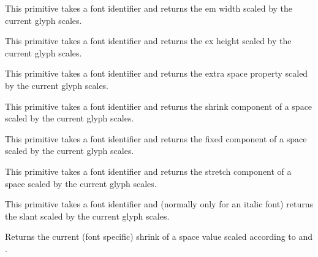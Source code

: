 \startnewprimitive[title={\prm {scaledfontemwidth}}]

This primitive takes a font identifier and returns the em width
scaled by the current glyph scales.

\stopnewprimitive

\startnewprimitive[title={\prm {scaledfontexheight}}]

This primitive takes a font identifier and returns the ex height
scaled by the current glyph scales.

\stopnewprimitive

\startnewprimitive[title={\prm {scaledfontextraspace}}]

This primitive takes a font identifier and returns the extra space
property scaled by the current glyph scales.

\stopnewprimitive

\startnewprimitive[title={\prm {scaledfontinterwordshrink}}]

This primitive takes a font identifier and returns the shrink
component of a space scaled by the current glyph scales.

\stopnewprimitive

\startnewprimitive[title={\prm {scaledfontinterwordspace}}]

This primitive takes a font identifier and returns the fixed
component of a space scaled by the current glyph scales.

\stopnewprimitive

\startnewprimitive[title={\prm {scaledfontinterwordstretch}}]

This primitive takes a font identifier and returns the stretch
component of a space scaled by the current glyph scales.

\stopnewprimitive

\startnewprimitive[title={\prm {scaledfontslantperpoint}}]

This primitive takes a font identifier and (normally only for an italic font)
returns the slant scaled by the current glyph scales.

\stopnewprimitive

\startnewprimitive[title={\prm {scaledinterwordshrink}}]

Returns the current (font specific) shrink of a space value scaled according to
 and .

\stopnewprimitive

\startnewprimitive[title={\prm {scaledinterwordspace}}]

